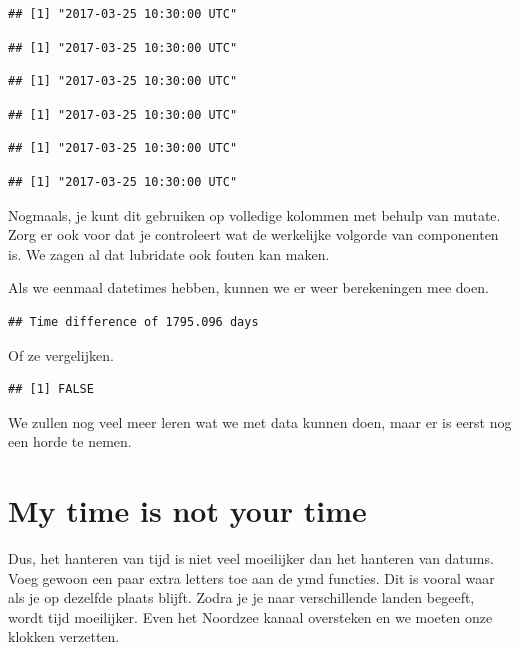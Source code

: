 \documentclass[]{tufte-book}
\begin{document}
\begin{verbatim}
## [1] "2017-03-25 10:30:00 UTC"
\end{verbatim}

\begin{verbatim}
## [1] "2017-03-25 10:30:00 UTC"
\end{verbatim}

\begin{verbatim}
## [1] "2017-03-25 10:30:00 UTC"
\end{verbatim}

\begin{verbatim}
## [1] "2017-03-25 10:30:00 UTC"
\end{verbatim}

\begin{verbatim}
## [1] "2017-03-25 10:30:00 UTC"
\end{verbatim}

\begin{verbatim}
## [1] "2017-03-25 10:30:00 UTC"
\end{verbatim}

Nogmaals, je kunt dit gebruiken op volledige kolommen met behulp van mutate. Zorg er ook voor dat je controleert wat de werkelijke volgorde van componenten is. We zagen al dat lubridate ook fouten kan maken.

Als we eenmaal datetimes hebben, kunnen we er weer berekeningen mee doen.

\begin{verbatim}
## Time difference of 1795.096 days
\end{verbatim}

Of ze vergelijken.

\begin{verbatim}
## [1] FALSE
\end{verbatim}

We zullen nog veel meer leren wat we met data kunnen doen, maar er is eerst nog een horde te nemen.

\hypertarget{my-time-is-not-your-time}{%
\section{My time is not your time}\label{my-time-is-not-your-time}}

Dus, het hanteren van tijd is niet veel moeilijker dan het hanteren van datums. Voeg gewoon een paar extra letters toe aan de ymd functies. Dit is vooral waar als je op dezelfde plaats blijft. Zodra je je naar verschillende landen begeeft, wordt tijd moeilijker. Even het Noordzee kanaal oversteken en we moeten onze klokken verzetten.
\end{document}
